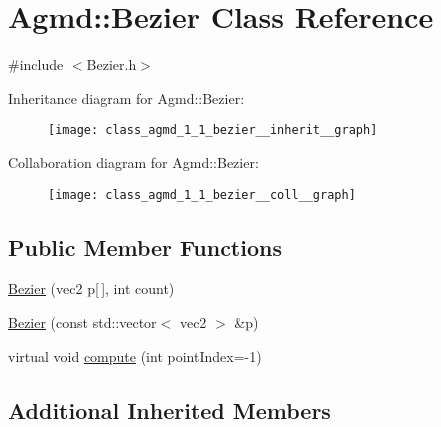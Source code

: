\hypertarget{class_agmd_1_1_bezier}{\section{Agmd\+:\+:Bezier Class Reference}
\label{class_agmd_1_1_bezier}
}


{\ttfamily \#include $<$Bezier.\+h$>$}



Inheritance diagram for Agmd\+:\+:Bezier\+:\nopagebreak
\begin{figure}[H]
\begin{center}
\leavevmode
\texttt{[image: class\_agmd\_1\_1\_bezier\_\_inherit\_\_graph]}
\end{center}
\end{figure}


Collaboration diagram for Agmd\+:\+:Bezier\+:\nopagebreak
\begin{figure}[H]
\begin{center}
\leavevmode
\texttt{[image: class\_agmd\_1\_1\_bezier\_\_coll\_\_graph]}
\end{center}
\end{figure}
\subsection*{Public Member Functions}
\begin{DoxyCompactItemize}
\item 
\hyperlink{class_agmd_1_1_bezier_a9a012d54dab518c11f2569b8322d54f6}{Bezier} (vec2 p\mbox{[}$\,$\mbox{]}, int count)
\item 
\hyperlink{class_agmd_1_1_bezier_a2091b1c4b42f73f2ae51f7b7f3de7fb6}{Bezier} (const std\+::vector$<$ vec2 $>$ \&p)
\item 
virtual void \hyperlink{class_agmd_1_1_bezier_ab2c80c0a53fa09b1bff334846e0b1d8e}{compute} (int point\+Index=-\/1)
\end{DoxyCompactItemize}
\subsection*{Additional Inherited Members}


